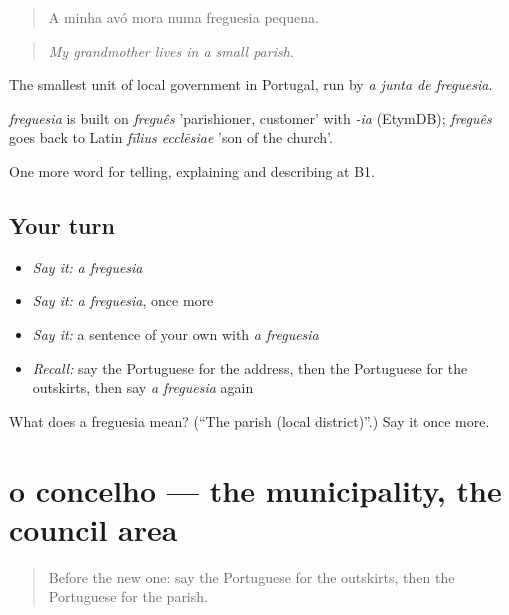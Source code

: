 \begin{quote}
A minha avó mora numa freguesia pequena.
\end{quote}

\begin{quote}
\emph{My grandmother lives in a small parish.}
\end{quote}

The smallest unit of local government in Portugal, run by \emph{a junta de freguesia}.

\begin{cousinweb}
\emph{freguesia} is built on \emph{freguês} 'parishioner, customer' with \emph{-ia} (EtymDB); \emph{freguês} goes back to Latin \emph{fīlius ecclēsiae} 'son of the church'.
\end{cousinweb}

\begin{grammarlens}[title={What you've built}]
One more word for telling, explaining and describing at B1.
\end{grammarlens}

\subsection*{Your turn}
\begin{itemize}
\raggedright
  \item \emph{Say it:} \emph{a freguesia}
  \item \emph{Say it:} \emph{a freguesia}, once more
  \item \emph{Say it:} a sentence of your own with \emph{a freguesia}
  \item \emph{Recall:} say the Portuguese for the address, then the Portuguese for the outskirts, then say \emph{a freguesia} again
\end{itemize}

\begin{tcolorbox}[breakable,colback=teal!4,colframe=teal!35!black,title={Before you move on}]
What does a freguesia mean? (\textquotedblleft{}The parish (local district)\textquotedblright{}.) Say it once more.
\end{tcolorbox}
\section[o concelho]{o concelho — the municipality, the council area}

\label{lesson:PT-C440-concelho}



\begin{quote}
Before the new one: say the Portuguese for the outskirts, then the Portuguese for the parish.
\end{quote}


